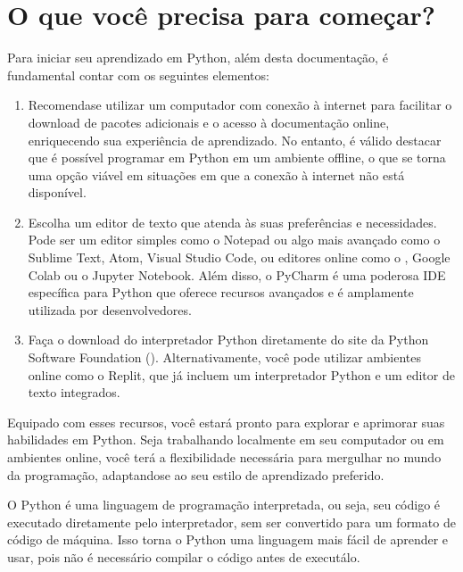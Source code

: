 \documentclass[letterpaper,10pt,english]{jupyterBook}
\begin{document}
\section{O que você precisa para começar?}
\label{\detokenize{chapters/ch1/ch1:o-que-voce-precisa-para-comecar}}
\sphinxAtStartPar
Para iniciar seu aprendizado em Python, além desta documentação, é fundamental contar com os seguintes elementos:
\begin{enumerate}
%
\item {} 
\sphinxAtStartPar
{} Recomenda\sphinxhyphen{}se utilizar um computador com conexão à internet para facilitar o download de pacotes adicionais e o acesso à documentação online, enriquecendo sua experiência de aprendizado. No entanto, é válido destacar que é possível programar em Python em um ambiente offline, o que se torna uma opção viável em situações em que a conexão à internet não está disponível.

\item {} 
\sphinxAtStartPar
{} Escolha um editor de texto que atenda às suas preferências e necessidades. Pode ser um editor simples como o Notepad ou algo mais avançado como o Sublime Text, Atom, Visual Studio Code, ou editores online como o , Google Colab ou o Jupyter Notebook. Além disso, o PyCharm é uma poderosa IDE específica para Python que oferece recursos avançados e é amplamente utilizada por desenvolvedores.

\item {} 
\sphinxAtStartPar
{} Faça o download do interpretador Python diretamente do site da Python Software Foundation (). Alternativamente, você pode utilizar ambientes online como o Replit, que já incluem um interpretador Python e um editor de texto integrados.

\end{enumerate}

\sphinxAtStartPar
Equipado com esses recursos, você estará pronto para explorar e aprimorar suas habilidades em Python. Seja trabalhando localmente em seu computador ou em ambientes online, você terá a flexibilidade necessária para mergulhar no mundo da programação, adaptando\sphinxhyphen{}se ao seu estilo de aprendizado preferido.

\sphinxAtStartPar
{} O Python é uma linguagem de programação interpretada, ou seja, seu código é executado diretamente pelo interpretador, sem ser convertido para um formato de código de máquina. Isso torna o Python uma linguagem mais fácil de aprender e usar, pois não é necessário compilar o código antes de executá\sphinxhyphen{}lo.
\end{document}
